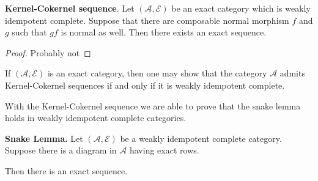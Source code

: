     \begin{lemma}
        \textbf{Kernel-Cokernel sequence}.
        Let $(\mathcal{A},\mathcal{E})$ be an exact category which is weakly idempotent complete. Suppose that there are composable normal morphism $f$ and $g$ such that $gf$ is normal as well. Then there exists an exact sequence.
        \begin{center}
        \end{center} 
    \end{lemma}

    \begin{proof}
        Probably not
    \end{proof}

    \begin{remark}
        If $(\mathcal{A},\mathcal{E})$ is an exact category, then one may show that the category $\mathcal{A}$ admits Kernel-Cokernel sequences if and only if it is weakly idempotent complete.
    \end{remark}

    With the Kernel-Cokernel sequence we are able to prove that the snake lemma holds in weakly idempotent complete categories.

    \begin{corollary}
        \textbf{Snake Lemma.}
        Let $(\mathcal{A},\mathcal{E})$ be a weakly idempotent complete category. Suppose there is a diagram in $\mathcal{A}$ having exact rows.
        \begin{center}
        \end{center}

        Then there is an exact sequence.
        \begin{center}
        \end{center}
    \end{corollary}

